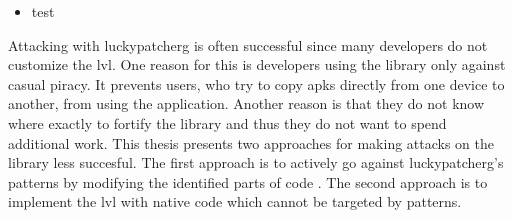 \begin{itemize}
    \item test
\end{itemize}
Attacking with \gls{luckypatcherg} is often successful since many developers do not customize the \gls{lvl}.
One reason for this is developers using the library only against casual piracy.
It prevents users, who try to copy \gls{apk}s directly from one device to another, from using the application.
Another reason is that they do not know where exactly to fortify the library and thus they do not want to spend additional work.
This thesis presents two approaches for making attacks on the library less succesful.
\newline
The first approach is to actively go against \gls{luckypatcherg}'s patterns by modifying the identified parts of code .
\newline
The second approach is to implement the \gls{lvl} with native code which cannot be targeted by patterns. \cite{developersSecuring} \cite{munteanLicense}
